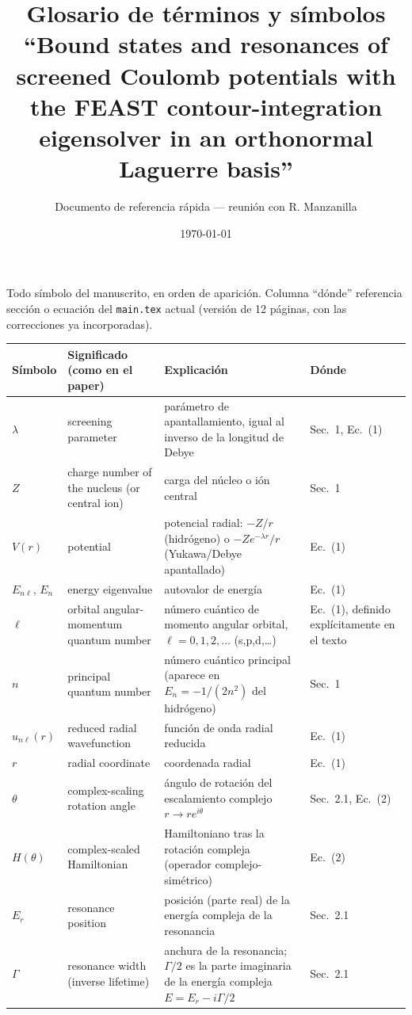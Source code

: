 \documentclass[11pt]{article}
\title{Glosario de t\'erminos y s\'imbolos\\
\large ``Bound states and resonances of screened Coulomb potentials with
the FEAST contour-integration eigensolver in an orthonormal Laguerre
basis''}
\author{Documento de referencia r\'apida --- reuni\'on con R. Manzanilla}
\date{\today}
\begin{document}
\maketitle
\noindent Todo s\'imbolo del manuscrito, en orden de aparici\'on. Columna
``d\'onde'' referencia secci\'on o ecuaci\'on del \texttt{main.tex} actual
(versi\'on de 12 p\'aginas, con las correcciones ya incorporadas).

\begingroup
\footnotesize
\begin{longtable}{@{}L{1.6cm}L{5.2cm}L{7.6cm}L{2.2cm}@{}}
\toprule
S\'imbolo & Significado (como en el paper) & Explicaci\'on & D\'onde \\
\midrule
\endhead
$\lambda$ & screening parameter & par\'ametro de apantallamiento, igual al
  inverso de la longitud de Debye & Sec.~1, Ec.~(1) \\
$Z$ & charge number of the nucleus (or central ion) & carga del n\'ucleo o
  i\'on central & Sec.~1 \\
$V(r)$ & potential & potencial radial: $-Z/r$ (hidr\'ogeno) o
  $-Ze^{-\lambda r}/r$ (Yukawa/Debye apantallado) & Ec.~(1) \\
$E_{n\ell}$, $E_n$ & energy eigenvalue & autovalor de energ\'ia & Ec.~(1) \\
$\ell$ & orbital angular-momentum quantum number & n\'umero cu\'antico de
  momento angular orbital, $\ell=0,1,2,\dots$ (s,p,d,\dots) & Ec.~(1),
  definido expl\'icitamente en el texto \\
$n$ & principal quantum number & n\'umero cu\'antico principal (aparece en
  $E_n=-1/(2n^2)$ del hidr\'ogeno) & Sec.~1 \\
$u_{n\ell}(r)$ & reduced radial wavefunction & funci\'on de onda radial
  reducida & Ec.~(1) \\
$r$ & radial coordinate & coordenada radial & Ec.~(1) \\
$\theta$ & complex-scaling rotation angle & \'angulo de rotaci\'on del
  escalamiento complejo $r\to re^{i\theta}$ & Sec.~2.1, Ec.~(2) \\
$H(\theta)$ & complex-scaled Hamiltonian & Hamiltoniano tras la rotaci\'on
  compleja (operador complejo-sim\'etrico) & Ec.~(2) \\
$E_r$ & resonance position & posici\'on (parte real) de la energ\'ia
  compleja de la resonancia & Sec.~2.1 \\
$\Gamma$ & resonance width (inverse lifetime) & anchura de la resonancia;
  $\Gamma/2$ es la parte imaginaria de la energ\'ia compleja
  $E=E_r-i\Gamma/2$ & Sec.~2.1 \\

\end{longtable}
\end{document}
